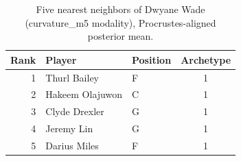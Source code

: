 \begin{table}[htbp]
  \centering\small
  \begin{tabular}{rllc}
    \toprule
    Rank & Player & Position & Archetype \\
    \midrule
    1 & Thurl Bailey & F & 1 \\
    2 & Hakeem Olajuwon & C & 1 \\
    3 & Clyde Drexler & G & 1 \\
    4 & Jeremy Lin & G & 1 \\
    5 & Darius Miles & F & 1 \\
    \bottomrule
  \end{tabular}
  \caption{Five nearest neighbors of Dwyane Wade (curvature_m5 modality), Procrustes-aligned posterior mean.}
  \label{tab:Dwyane_Wade_neighbors_curvature_m5}
\end{table}

